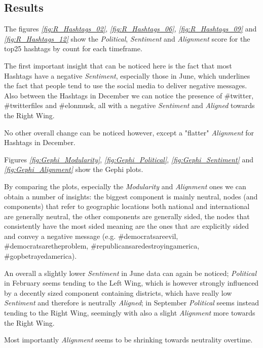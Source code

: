 \documentclass[twoside,twocolumn]{article}
\begin{document}
	\subsection{Results}
	The figures \textit{\ref{fig:R_Hashtags_02}}, \textit{\ref{fig:R_Hashtags_06}}, \textit{\ref{fig:R_Hashtags_09}} and \textit{\ref{fig:R_Hashtags_12}} show the \textit{Political}, \textit{Sentiment} and \textit{Alignment} score for the top25 hashtags by count for each timeframe.
	
	The first important insight that can be noticed here is the fact that most Hashtags have a negative \textit{Sentiment}, especially those in June, which underlines the fact that people tend to use the social media to deliver negative messages.
	Also between the Hashtags in December we can notice the presence of \#twitter, \#twitterfiles and \#elonmusk, all with a negative \textit{Sentiment} and \textit{Aligned} towards the Right Wing.
	
	No other overall change can be noticed however, except a "flatter" \textit{Alignment} for Hashtags in December.

	Figures \textit{\ref{fig:Gephi_Modularity}}, \textit{\ref{fig:Gephi_Political}}, \textit{\ref{fig:Gephi_Sentiment}} and \textit{\ref{fig:Gephi_Alignment}} show the Gephi plots.
	
	By comparing the plots, especially the \textit{Modularity} and \textit{Alignment} ones we can obtain a number of insights: the biggest component is mainly neutral, nodes (and components) that refer to geographic locations both national and international are generally neutral, the other components are generally sided, the nodes that consistently have the most sided meaning are the ones that are explicitly sided and convey a negative message (e.g. \#democratsareevil, \#democratsaretheproblem, \#republicansaredestroyingamerica, \#gopbetrayedamerica).
	
	An overall a slightly lower \textit{Sentiment} in June data can again be noticed; \textit{Political} in February seems tending to the Left Wing, which is however strongly influenced by a decently sized component containing districts, which have really low \textit{Sentiment} and therefore is neutrally \textit{Aligned}; in September \textit{Political} seems instead tending to the Right Wing, seemingly with also a slight \textit{Alignment} more towards the Right Wing.
	
	Most importantly \textit{Alignment} seems to be shrinking towards neutrality overtime.
	
\end{document}
